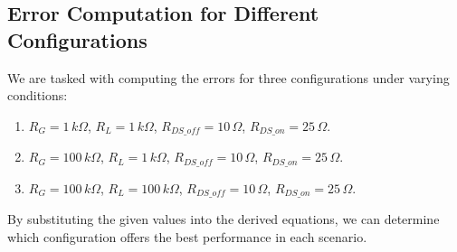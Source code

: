 \documentclass[a4paper,9pt,twoside,openany,twocolumn]{memoir}
\begin{document}
\subsection{Error Computation for Different Configurations}
We are tasked with computing the errors for three configurations under varying conditions:
\begin{enumerate}
    \item \( R_G = 1\,k\Omega \), \( R_L = 1\,k\Omega \), \( R_{DS\_off} = 10\,\Omega \), \( R_{DS\_on} = 25\,\Omega \).
    \item \( R_G = 100\,k\Omega \), \( R_L = 1\,k\Omega \), \( R_{DS\_off} = 10\,\Omega \), \( R_{DS\_on} = 25\,\Omega \).
    \item \( R_G = 100\,k\Omega \), \( R_L = 100\,k\Omega \), \( R_{DS\_off} = 10\,\Omega \), \( R_{DS\_on} = 25\,\Omega \).
\end{enumerate}

\noindent By substituting the given values into the derived equations, we can determine which configuration offers the best performance in each scenario.
\end{document}

